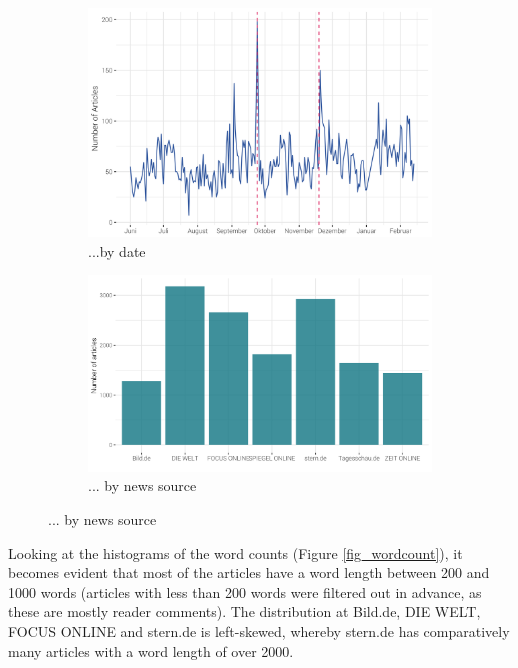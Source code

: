 \documentclass[12pt,a4paper,notitlepage]{article}
\begin{document}
\begin{figure}[H]
	\caption{Article distribution...}
	\begin{center}
		\begin{subfigure}[normla]{0.49\textwidth}
			\includegraphics[width=\textwidth]{../figs/timeline.png}
			\caption{...by date}
			\label{fig_distr1}
		\end{subfigure}
		\begin{subfigure}[normla]{0.49\textwidth}
			\includegraphics[width=\textwidth]{../figs/bar.png}
			\caption{... by news source}
			\label{fig_distr2}
		\end{subfigure}
	\end{center}
\end{figure}

Looking at the histograms of the word counts (Figure \ref{fig_wordcount}), it becomes evident that most of the articles have a word length between 200 and 1000 words (articles with less than 200 words were filtered out in advance, as these are mostly reader comments). The distribution at Bild.de, DIE WELT, FOCUS ONLINE and stern.de is left-skewed, whereby stern.de has comparatively many articles with a word length of over 2000. 
\end{document}
